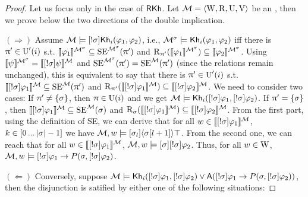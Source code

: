 \begin{proof}

Let us focus only in the case of $\axm{RKh}$.  
Let $\modults = \tup{\W, \R, \Unc, \V}$ be an \ults, then we prove below the two directions of the double implication.

$(\Rightarrow)$ Assume $\modults \models \srefbox{\plan} \khi(\varphi_1,\varphi_2)$, i.e.,  $\modults^\plan \models \khi(\varphi_1,\varphi_2)$ iff there is $\plans' \in \Unc'(i)$ s.t. $\truthset{\modults^\plan}{\varphi_1} \subseteq \stexec^{\modults^\plan}(\plans')$ and $\R_{\plans'}(\truthset{\modults^\plan}{\varphi_1}) \subseteq \truthset{\modults^\plan}{\varphi_2}$.
Using $\truthset{\modults^\plan}{\psi} = \truthset{\modults}{\srefbox{\plan} \psi}$ and $\stexec^{\modults^\plan}(\plans') = \stexec^\modults(\plans')$ (since the relations remain unchanged), this is equivalent to say that there is $\plans' \in \Unc'(i)$ s.t. $\truthset{\modults}{\srefbox{\plan} \varphi_1} \subseteq \stexec^\modults(\plans')$ and $\R_{\plans'}(\truthset{\modults}{\srefbox{\plan} \varphi_1}) \subseteq \truthset{\modults}{\srefbox{\plan} \varphi_2}$. We need to consider two cases:
If $\plans' \neq \set{\plan}$, then $\plans \in \Unc(i)$ and we get $\modults \models \khi(\srefbox{\plan}\varphi_1,\srefbox{\plan}\varphi_2)$.
If $\plans' = \set{\plan}$, then $\truthset{\modults}{\srefbox{\plan}\varphi_1} \subseteq \stexec^\modults(\plan)$ and $\R_\plan(\truthset{\modults}{\srefbox{\plan}\varphi_1}) \subseteq \truthset{\modults}{\srefbox{\plan}\varphi_2}$.
From the first part, using the definition of SE, we can derive that for all $w \in \truthset{\modults}{\srefbox{\plan}\varphi_1}$, $k \in \intint{0}{\card{\plan}-1}$ we have $\modults,w \models \mlbox{\plan_l}\mldiam{\plan[l+1]}\top$.
From the second one, we can reach that for all $w \in \truthset{\modults}{\srefbox{\plan}\varphi_1}$, $\modults,w \models \mlbox{\plan} \srefbox{\plan}\varphi_2$.
Thus, for all $w \in \W$, $\modults,w \models \srefbox{\plan} \varphi_1 \ra P(\plan,\srefbox{\plan}\varphi_2)$.

$(\Leftarrow)$ Conversely, suppose $\modults \models \khi(\srefbox{\plan} \varphi_1,\srefbox{\plan} \varphi_2) \vee \A(\srefbox{\plan} \varphi_1 \ra P(\plan,\srefbox{\plan}\varphi_2))$, then the disjunction is satified by either one of the following situations:


\end{proof}
